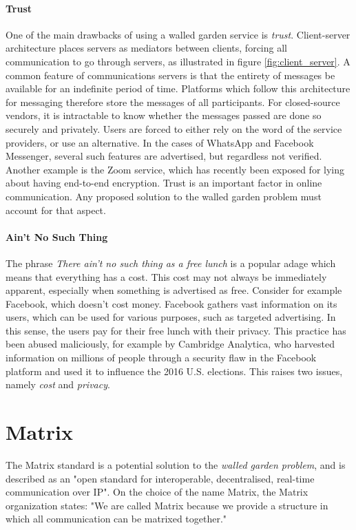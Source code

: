 \paragraph{Trust}
One of the main drawbacks of using a walled garden service is \textit{trust}.
Client-server architecture places servers as mediators between clients, forcing all communication to go through servers, as illustrated in figure \ref{fig:client_server}.
A common feature of communications servers is that the entirety of messages be available for an indefinite period of time.
Platforms which follow this architecture for messaging therefore store the messages of all participants.
For closed-source vendors, it is intractable to know whether the messages passed are done so securely and privately.
Users are forced to either rely on the word of the service providers, or use an alternative.
In the cases of WhatsApp and Facebook Messenger, several such features are advertised, but regardless not verified\cite{twitter_comms_protocol_comparison}.
Another example is the Zoom service, which has recently been exposed for lying about having end-to-end encryption\cite{zoom_e2ee_or_not}.
Trust is an important factor in online communication.
Any proposed solution to the walled garden problem must account for that aspect.

\paragraph{Ain't No Such Thing}
The phrase \textit{There ain't no such thing as a free lunch} is a popular adage which means that everything has a cost.
This cost may not always be immediately apparent, especially when something is advertised as free.
Consider for example Facebook, which doesn't cost money.
Facebook gathers vast information on its users, which can be used for various purposes, such as targeted advertising.
In this sense, the users pay for their free lunch with their privacy.
This practice has been abused maliciously, for example by Cambridge Analytica,
who harvested information on millions of people through a security flaw in the Facebook platform and used it to influence the 2016 U.S. elections\cite{cadwalladr2018revealed, cadwalladr2018cambridge, isaak2018user, berghel2018malice}.
This raises two issues, namely \textit{cost} and \textit{privacy}.

\section{Matrix}
The Matrix standard is a potential solution to the \textit{walled garden problem}, and is described as an "open standard for interoperable, decentralised, real-time communication over IP"\cite{matrix_org}.
On the choice of the name Matrix, the Matrix organization states: "We are called Matrix because we provide a structure in which all communication can be matrixed together."\cite{matrix_org_faq}

